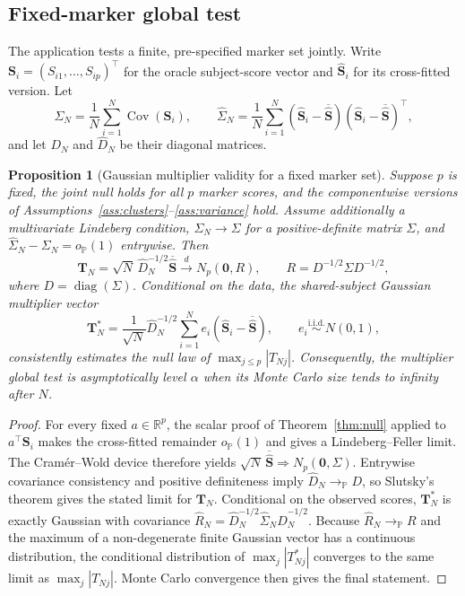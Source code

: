 \documentclass[11pt]{article}
\newtheorem{proposition}[theorem]{Proposition}
\theoremstyle{definition}
\newcommand{\Cov}{\operatorname{Cov}}
\newcommand{\op}{o_{\mathbb{P}}}
\newcommand{\R}{\mathbb{R}}
\begin{document}
\subsection{Fixed-marker global test}

The application tests a finite, pre-specified marker set jointly. Write
$\bm S_i=(S_{i1},\ldots,S_{ip})^\top$ for the oracle subject-score vector and
$\widehat{\bm S}_i$ for its cross-fitted version. Let
\[
\Sigma_N=\frac1N\sum_{i=1}^N\Cov(\bm S_i),
\qquad
\widehat\Sigma_N=\frac1N\sum_{i=1}^N
(\widehat{\bm S}_i-\overline{\widehat{\bm S}})
(\widehat{\bm S}_i-\overline{\widehat{\bm S}})^\top,
\]
and let $D_N$ and $\widehat D_N$ be their diagonal matrices.

\begin{proposition}[Gaussian multiplier validity for a fixed marker set]
\label{prop:multiplier}
Suppose $p$ is fixed, the joint null holds for all $p$ marker scores, and the componentwise
versions of Assumptions~\ref{ass:clusters}--\ref{ass:variance} hold. Assume additionally a
multivariate Lindeberg condition,
$\Sigma_N\to\Sigma$ for a positive-definite matrix $\Sigma$, and
$\widehat\Sigma_N-\Sigma_N=\op(1)$ entrywise. Then
\[
\bm T_N=\sqrt N\,\widehat D_N^{-1/2}
\overline{\widehat{\bm S}}
\xrightarrow{d}N_p(\bm 0,R),
\qquad
R=D^{-1/2}\Sigma D^{-1/2},
\]
where $D=\operatorname{diag}(\Sigma)$. Conditional on the data, the shared-subject Gaussian
multiplier vector
\[
\bm T_N^*=\frac1{\sqrt N}\widehat D_N^{-1/2}
\sum_{i=1}^Ne_i(\widehat{\bm S}_i-\overline{\widehat{\bm S}}),
\qquad e_i\stackrel{\mathrm{i.i.d.}}{\sim}N(0,1),
\]
consistently estimates the null law of $\max_{j\leq p}|T_{Nj}|$. Consequently, the
multiplier global test is asymptotically level $\alpha$ when its Monte Carlo size tends to
infinity after $N$.
\end{proposition}

\begin{proof}
For every fixed $a\in\R^p$, the scalar proof of Theorem~\ref{thm:null} applied to
$a^\top\bm S_i$ makes the cross-fitted remainder $\op(1)$ and gives a Lindeberg--Feller
limit. The Cram\'er--Wold device therefore yields
$\sqrt N\,\overline{\widehat{\bm S}}\Rightarrow N_p(\bm0,\Sigma)$.
Entrywise covariance consistency and positive definiteness imply
$\widehat D_N\to_{\mathbb P}D$, so Slutsky's theorem gives the stated limit for $\bm T_N$.
Conditional on the observed scores, $\bm T_N^*$ is exactly Gaussian with covariance
$\widehat R_N=\widehat D_N^{-1/2}\widehat\Sigma_N\widehat D_N^{-1/2}$.
Because $\widehat R_N\to_{\mathbb P}R$ and the maximum of a non-degenerate finite Gaussian
vector has a continuous distribution, the conditional distribution of
$\max_j|T_{Nj}^*|$ converges to the same limit as $\max_j|T_{Nj}|$. Monte Carlo convergence
then gives the final statement.
\end{proof}
\end{document}
